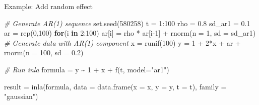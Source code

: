 \documentclass[
  ignorenonframetext,
]{beamer}
\newenvironment{Shaded}{\begin{snugshade}}{\end{snugshade}}
\newcommand{\AttributeTok}[1]{\textcolor[rgb]{0.77,0.63,0.00}{#1}}
\newcommand{\CommentTok}[1]{\textcolor[rgb]{0.56,0.35,0.01}{\textit{#1}}}
\newcommand{\ControlFlowTok}[1]{\textcolor[rgb]{0.13,0.29,0.53}{\textbf{#1}}}
\newcommand{\DecValTok}[1]{\textcolor[rgb]{0.00,0.00,0.81}{#1}}
\newcommand{\FloatTok}[1]{\textcolor[rgb]{0.00,0.00,0.81}{#1}}
\newcommand{\FunctionTok}[1]{\textcolor[rgb]{0.00,0.00,0.00}{#1}}
\newcommand{\NormalTok}[1]{#1}
\newcommand{\OtherTok}[1]{\textcolor[rgb]{0.56,0.35,0.01}{#1}}
\newcommand{\SpecialCharTok}[1]{\textcolor[rgb]{0.00,0.00,0.00}{#1}}
\newcommand{\StringTok}[1]{\textcolor[rgb]{0.31,0.60,0.02}{#1}}
\begin{document}
\begin{frame}[fragile]{Example: Add random effect}
\protect\hypertarget{example-add-random-effect-1}{}
\small

\begin{Shaded}
\begin{Highlighting}[]
\CommentTok{\# Generate AR(1) sequence}
\FunctionTok{set.seed}\NormalTok{(}\DecValTok{580258}\NormalTok{)}
\NormalTok{t }\OtherTok{=} \DecValTok{1}\SpecialCharTok{:}\DecValTok{100}
\NormalTok{rho }\OtherTok{=} \FloatTok{0.8}
\NormalTok{sd\_ar1 }\OtherTok{=} \FloatTok{0.1}
\NormalTok{ar }\OtherTok{=} \FunctionTok{rep}\NormalTok{(}\DecValTok{0}\NormalTok{,}\DecValTok{100}\NormalTok{)}
\ControlFlowTok{for}\NormalTok{(i }\ControlFlowTok{in} \DecValTok{2}\SpecialCharTok{:}\DecValTok{100}\NormalTok{)}
\NormalTok{  ar[i] }\OtherTok{=}\NormalTok{ rho }\SpecialCharTok{*}\NormalTok{ ar[i}\DecValTok{{-}1}\NormalTok{] }\SpecialCharTok{+} \FunctionTok{rnorm}\NormalTok{(}\AttributeTok{n =} \DecValTok{1}\NormalTok{, }\AttributeTok{sd =}\NormalTok{ sd\_ar1)}
\CommentTok{\# Generate data with AR(1) component}
\NormalTok{x }\OtherTok{=} \FunctionTok{runif}\NormalTok{(}\DecValTok{100}\NormalTok{)}
\NormalTok{y }\OtherTok{=} \DecValTok{1} \SpecialCharTok{+} \DecValTok{2}\SpecialCharTok{*}\NormalTok{x }\SpecialCharTok{+}\NormalTok{ ar }\SpecialCharTok{+} \FunctionTok{rnorm}\NormalTok{(}\AttributeTok{n =} \DecValTok{100}\NormalTok{, }\AttributeTok{sd =} \FloatTok{0.2}\NormalTok{)}

\CommentTok{\# Run inla}
\NormalTok{formula }\OtherTok{=}\NormalTok{ y }\SpecialCharTok{\textasciitilde{}} \DecValTok{1} \SpecialCharTok{+}\NormalTok{ x }\SpecialCharTok{+} \FunctionTok{f}\NormalTok{(t, }\AttributeTok{model=}\StringTok{"ar1"}\NormalTok{)}

\NormalTok{result }\OtherTok{=} \FunctionTok{inla}\NormalTok{(formula,}
     \AttributeTok{data =} \FunctionTok{data.frame}\NormalTok{(}\AttributeTok{x =}\NormalTok{ x, }\AttributeTok{y =}\NormalTok{ y, }\AttributeTok{t =}\NormalTok{ t),}
     \AttributeTok{family =} \StringTok{"gaussian"}\NormalTok{)}
\end{Highlighting}
\end{Shaded}

\normalsize
\end{frame}
\end{document}
